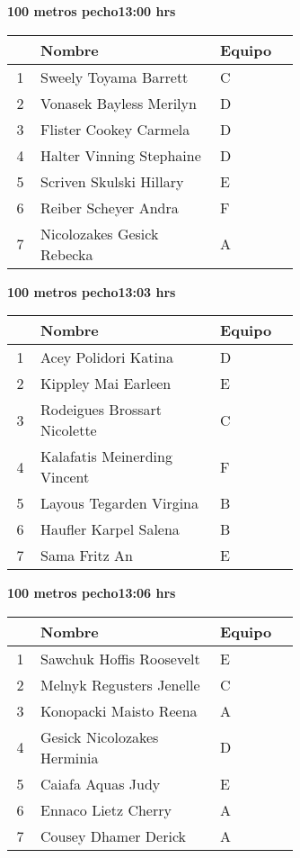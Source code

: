 \begin{minipage}{0.95\linewidth}
\begin{center}
\textbf{
100 metros pecho\hspace{1cm}13:00 hrs}
\end{center}
\begin{tabular}{cp{0.63\linewidth}l}
\hline
& \textbf{Nombre} & \textbf{Equipo} \\ \hline
1 & Sweely Toyama Barrett & C \\ 
2 & Vonasek Bayless Merilyn & D \\ 
3 & Flister Cookey Carmela & D \\ 
4 & Halter Vinning Stephaine & D \\ 
5 & Scriven Skulski Hillary & E \\ 
6 & Reiber Scheyer Andra & F \\ 
7 & Nicolozakes Gesick Rebecka & A \\ 
\end{tabular}
\end{minipage}
\begin{minipage}{0.95\linewidth}
\begin{center}
\textbf{
100 metros pecho\hspace{1cm}13:03 hrs}
\end{center}
\begin{tabular}{cp{0.63\linewidth}l}
\hline
& \textbf{Nombre} & \textbf{Equipo} \\ \hline
1 & Acey Polidori Katina & D \\ 
2 & Kippley Mai Earleen & E \\ 
3 & Rodeigues Brossart Nicolette & C \\ 
4 & Kalafatis Meinerding Vincent & F \\ 
5 & Layous Tegarden Virgina & B \\ 
6 & Haufler Karpel Salena & B \\ 
7 & Sama Fritz An & E \\ 
\end{tabular}
\end{minipage}
\begin{minipage}{0.95\linewidth}
\begin{center}
\textbf{
100 metros pecho\hspace{1cm}13:06 hrs}
\end{center}
\begin{tabular}{cp{0.63\linewidth}l}
\hline
& \textbf{Nombre} & \textbf{Equipo} \\ \hline
1 & Sawchuk Hoffis Roosevelt & E \\ 
2 & Melnyk Regusters Jenelle & C \\ 
3 & Konopacki Maisto Reena & A \\ 
4 & Gesick Nicolozakes Herminia & D \\ 
5 & Caiafa Aquas Judy & E \\ 
6 & Ennaco Lietz Cherry & A \\ 
7 & Cousey Dhamer Derick & A \\ 
\end{tabular}
\end{minipage}
